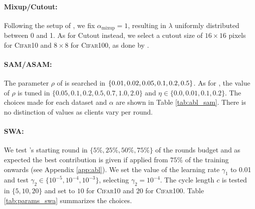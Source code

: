 \paragraph{Mixup/Cutout:} Following the setup of \cite{zhang2017mixup}, we fix $\alpha_\text{mixup}=1$, resulting in $\lambda$ uniformly distributed between 0 and 1. As for Cutout instead, we select a cutout size of $16\times16$ pixels for \textsc{Cifar10} and $8\times8$ for \textsc{Cifar100}, as done by \cite{devries2017improved}.  

\paragraph{SAM/ASAM:} The parameter $\rho$ of \sam is searched in $\{0.01,0.02,0.05,0.1,0.2,\\0.5\}$. As for \asam, the value of $\rho$ is tuned in $\{0.05,0.1,0.2,0.5,0.7,1.0,2.0\}$ and $\eta\in\{0.0,0.01,0.1,0.2\}$. The choices made for each dataset and $\alpha$ are shown in Table \ref{tab:abl_sam}. There is no distinction of values as clients vary per round.

\paragraph{SWA:} We test \swa's starting round in $\{5\%, 25\%, 50\%, 75\%\}$ of the rounds budget and as expected \cite{izmailov2018averaging} the best contribution is given if applied from $75\%$ of the training onwards (see Appendix \ref{app:abl}). We set the value of the learning rate $\gamma_1$ to 0.01 and test $\gamma_2\in \{10^{-5}, 10^{-4}, 10^{-3}\}$, selecting $\gamma_2=10^{-4}$. The cycle length $c$ is tested in $\{5,10,20\}$ and set to $10$ for \textsc{Cifar10} and $20$ for \textsc{Cifar100}. Table \ref{tab:params_swa} summarizes the choices. 


